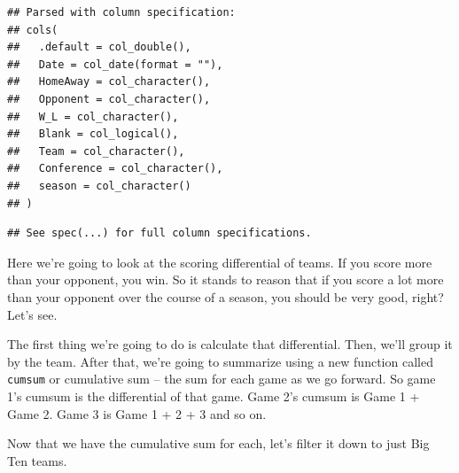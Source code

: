 \documentclass[
]{book}
\newenvironment{Shaded}{\begin{snugshade}}{\end{snugshade}}
\newcommand{\DataTypeTok}[1]{\textcolor[rgb]{0.13,0.29,0.53}{#1}}
\newcommand{\KeywordTok}[1]{\textcolor[rgb]{0.13,0.29,0.53}{\textbf{#1}}}
\newcommand{\NormalTok}[1]{#1}
\newcommand{\OperatorTok}[1]{\textcolor[rgb]{0.81,0.36,0.00}{\textbf{#1}}}
\newcommand{\StringTok}[1]{\textcolor[rgb]{0.31,0.60,0.02}{#1}}
\begin{document}
\begin{verbatim}
## Parsed with column specification:
## cols(
##   .default = col_double(),
##   Date = col_date(format = ""),
##   HomeAway = col_character(),
##   Opponent = col_character(),
##   W_L = col_character(),
##   Blank = col_logical(),
##   Team = col_character(),
##   Conference = col_character(),
##   season = col_character()
## )
\end{verbatim}

\begin{verbatim}
## See spec(...) for full column specifications.
\end{verbatim}

Here we're going to look at the scoring differential of teams. If you score more than your opponent, you win. So it stands to reason that if you score a lot more than your opponent over the course of a season, you should be very good, right? Let's see.

The first thing we're going to do is calculate that differential. Then, we'll group it by the team. After that, we're going to summarize using a new function called \texttt{cumsum} or cumulative sum -- the sum for each game as we go forward. So game 1's cumsum is the differential of that game. Game 2's cumsum is Game 1 + Game 2. Game 3 is Game 1 + 2 + 3 and so on.

\begin{Shaded}
\end{Shaded}

Now that we have the cumulative sum for each, let's filter it down to just Big Ten teams.

\begin{Shaded}
\end{Shaded}
\end{document}
